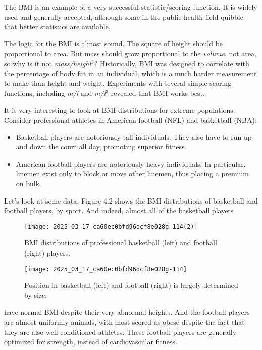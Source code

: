 \documentclass[10pt]{article}
\begin{document}
The BMI is an example of a very successful statistic/scoring function. It is widely used and generally accepted, although some in the public health field quibble that better statistics are available.

The logic for the BMI is almost sound. The square of height should be proportional to area. But mass should grow proportional to the \textit{volume}, not area, so why is it not \textit{mass/height}$^3$? Historically, BMI was designed to correlate with the percentage of body fat in an individual, which is a much harder measurement to make than height and weight. Experiments with several simple scoring functions, including \textit{m/l} and \textit{m/l}$^3$ revealed that BMI works best.

It is very interesting to look at BMI distributions for extreme populations. Consider professional athletes in American football (NFL) and basketball (NBA):
\begin{itemize}
  \item Basketball players are notoriously tall individuals. They also have to run up and down the court all day, promoting superior fitness.
  \item American football players are notoriously heavy individuals. In particular, linemen exist only to block or move other linemen, thus placing a premium on bulk.
\end{itemize}

Let's look at some data. Figure 4.2 shows the BMI distributions of basketball and football players, by sport. And indeed, almost all of the basketball players

\begin{figure}[h]
\centering
\texttt{[image: 2025\_03\_17\_ca60ec0bfd96dcf8e028g-114(2)]}
\caption{BMI distributions of professional basketball (left) and football (right) players.}
\end{figure}

\begin{figure}[h]
\centering
\texttt{[image: 2025\_03\_17\_ca60ec0bfd96dcf8e028g-114]}
\caption{Position in basketball (left) and football (right) is largely determined by size.}
\end{figure}

have normal BMI despite their very abnormal heights. And the football players are almost uniformly animals, with most scored as obese despite the fact that they are also well-conditioned athletes. These football players are generally optimized for strength, instead of cardiovascular fitness.
\end{document}
